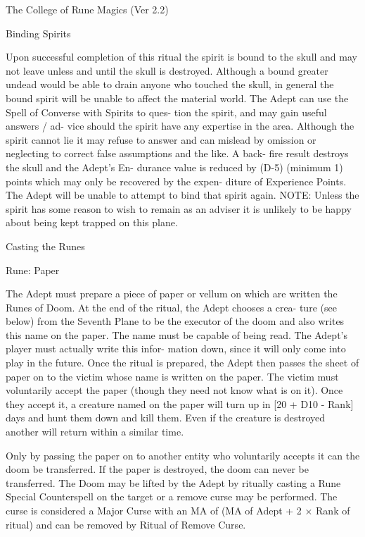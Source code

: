 \begin{Chapter}{The College of Rune Magics (Ver 2.2)}
\begin{ritual}[R-2]{Binding Spirits }
\begin{effects}
Upon successful completion of this ritual the spirit 
is bound to the skull and may not leave unless and 
until  the  skull  is  destroyed.  Although  a  bound 
greater undead would be able to drain anyone who 
touched  the  skull,  in  general  the  bound  spirit  will 
be  unable  to  affect  the  material  world.  The  Adept 
can use the Spell of Converse with Spirits to ques-
tion  the  spirit,  and  may  gain  useful  answers  /  ad-
vice  should  the  spirit  have  any  expertise  in  the 
area. Although the spirit cannot lie it may refuse to 
answer and can mislead by omission or neglecting 
to  correct  false  assumptions  and  the  like.  A  back-
fire  result  destroys  the  skull  and  the  Adept’s  En-
durance  value  is  reduced  by  (D-5)  (minimum  1) 
points which may only be recovered by the expen-
diture  of  Experience  Points.  The  Adept  will  be 
unable  to  attempt  to  bind that  spirit again.  NOTE: 
Unless the spirit has some reason to wish to remain 
as an adviser it is unlikely to be happy about being 
kept trapped on this plane. 

\end{effects}
\end{ritual}

\begin{ritual}[R-3]{Casting the Runes }

Rune: Paper 
\begin{effects}
 The  Adept  must  prepare  a  piece  of  paper 
or vellum on which are written the Runes of Doom. 
At the end of the ritual, the Adept chooses a crea-
ture  (see  below)  from  the  Seventh  Plane  to  be  the 
executor of the doom and also writes this name on 
the paper. The name must be capable of being read. 
The  Adept’s  player  must  actually  write  this  infor-
mation  down,  since  it  will  only  come  into  play  in 
the  future.  Once  the  ritual  is  prepared,  the  Adept 
then  passes  the  sheet  of  paper  on  to  the  victim 
whose  name  is  written  on  the  paper.  The  victim 
must  voluntarily  accept  the  paper  (though  they 
need not know what is on it). Once they accept it, a 
creature  named  on  the  paper  will  turn  up  in [20  + 
D10  -  Rank]  days  and  hunt  them  down  and  kill 
them. Even if the creature is destroyed another will 
return within a similar time. 

Only by passing the paper on to another entity who 
voluntarily  accepts it can the doom be  transferred. 
If  the  paper  is  destroyed,  the  doom  can  never  be 
transferred. The Doom may be lifted by the Adept 
by ritually casting a Rune Special Counterspell on 
the  target  or  a  remove  curse  may  be  performed. 
The curse is considered a Major Curse with an MA 
of (MA of Adept + 2 × Rank of ritual) and can be 
removed by Ritual of Remove Curse. 


\end{effects}
\end{ritual}
\end{Chapter}
